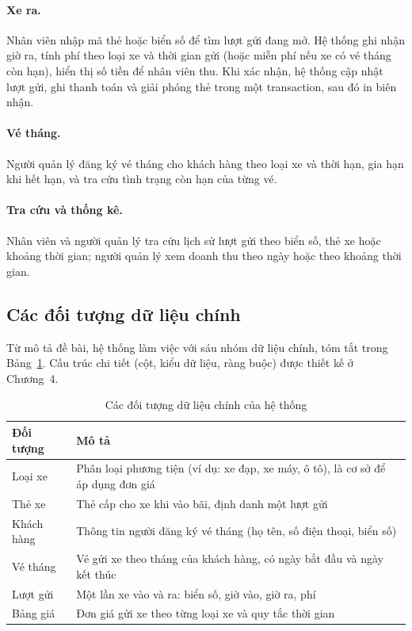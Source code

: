 \paragraph{Xe ra.} Nhân viên nhập mã thẻ hoặc biển số để tìm lượt gửi đang mở. Hệ thống ghi nhận giờ ra, tính phí theo loại xe và thời gian gửi (hoặc miễn phí nếu xe có vé tháng còn hạn), hiển thị số tiền để nhân viên thu. Khi xác nhận, hệ thống cập nhật lượt gửi, ghi thanh toán và giải phóng thẻ trong một transaction, sau đó in biên nhận.

\paragraph{Vé tháng.} Người quản lý đăng ký vé tháng cho khách hàng theo loại xe và thời hạn, gia hạn khi hết hạn, và tra cứu tình trạng còn hạn của từng vé.

\paragraph{Tra cứu và thống kê.} Nhân viên và người quản lý tra cứu lịch sử lượt gửi theo biển số, thẻ xe hoặc khoảng thời gian; người quản lý xem doanh thu theo ngày hoặc theo khoảng thời gian.

\subsection{Các đối tượng dữ liệu chính}

Từ mô tả đề bài, hệ thống làm việc với sáu nhóm dữ liệu chính, tóm tắt trong Bảng~\ref{tab:doituong}. Cấu trúc chi tiết (cột, kiểu dữ liệu, ràng buộc) được thiết kế ở Chương~4.

\begin{table}[h]
  \centering
  \begin{tabular}{@{}lp{10.5cm}@{}}
    \toprule
    \textbf{Đối tượng} & \textbf{Mô tả} \\
    \midrule
    Loại xe & Phân loại phương tiện (ví dụ: xe đạp, xe máy, ô tô), là cơ sở để áp dụng đơn giá \\
    Thẻ xe & Thẻ cấp cho xe khi vào bãi, định danh một lượt gửi \\
    Khách hàng & Thông tin người đăng ký vé tháng (họ tên, số điện thoại, biển số) \\
    Vé tháng & Vé gửi xe theo tháng của khách hàng, có ngày bắt đầu và ngày kết thúc \\
    Lượt gửi & Một lần xe vào và ra: biển số, giờ vào, giờ ra, phí \\
    Bảng giá & Đơn giá gửi xe theo từng loại xe và quy tắc thời gian \\
    \bottomrule
  \end{tabular}
    \caption{Các đối tượng dữ liệu chính của hệ thống}
  \label{tab:doituong}
\end{table}

